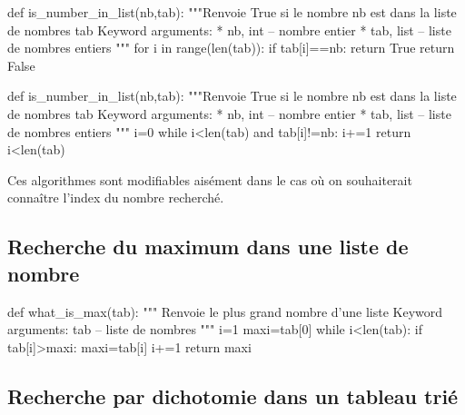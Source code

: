 \documentclass[10pt]{article}
\begin{document}
\begin{minipage}[c]{.49\linewidth}
\begin{py}
\begin{python}
def is_number_in_list(nb,tab):
    """Renvoie True si le nombre nb est dans la liste 
    de nombres tab
    Keyword arguments:
      * nb, int -- nombre entier
      * tab, list -- liste de nombres entiers    
    """
    for i in range(len(tab)):
        if tab[i]==nb:
            return True
    return False
\end{python}
\end{py}
\end{minipage}\hfill
\begin{minipage}[c]{.49\linewidth}
\begin{py}
\begin{python}
def is_number_in_list(nb,tab):
    """Renvoie True si le nombre nb est dans la liste 
    de nombres tab
    Keyword arguments:
      * nb, int -- nombre entier
      * tab, list -- liste de nombres entiers    
    """
    i=0
    while i<len(tab) and tab[i]!=nb:
        i+=1
    return i<len(tab)
\end{python}
\end{py}
\end{minipage}

\begin{rem}
Ces algorithmes sont modifiables aisément dans le cas où on souhaiterait connaître l'index du nombre recherché.
\end{rem}




\subsection{Recherche du maximum dans une liste de nombre}
\begin{py}
\begin{python}
def what_is_max(tab):
    """ 
    Renvoie le plus grand nombre d'une liste
    Keyword arguments:
    tab -- liste de nombres 
    """
    i=1
    maxi=tab[0]
    while i<len(tab):
        if tab[i]>maxi:
            maxi=tab[i]
        i+=1
    return maxi
\end{python}
\end{py}
\subsection{Recherche par dichotomie dans un tableau trié}
\end{document}
